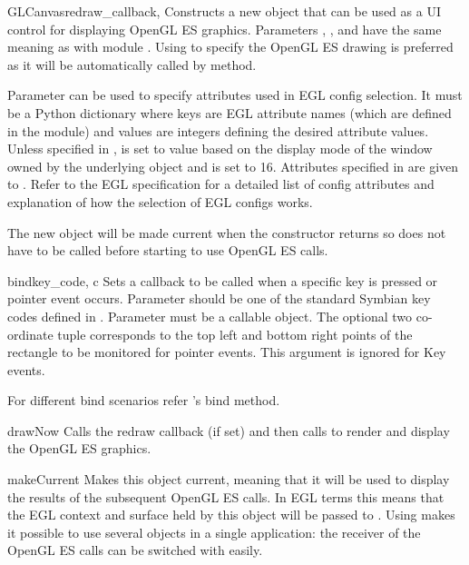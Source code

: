 \begin{classdesc}{GLCanvas}{redraw_callback, }
Constructs a new  object that can be used as a UI control for
displaying OpenGL ES graphics. Parameters ,
, and  have the same meaning as with
 module . Using  to specify
the OpenGL ES drawing is preferred as it will be automatically called by
 method.

Parameter  can be used to specify attributes used in EGL config
selection. It must be a Python dictionary where keys are EGL attribute names
(which are defined in the  module) and values are integers
defining the desired attribute values. Unless specified in ,
 is set to value based on the display mode of the window
owned by the underlying  object and  is
set to 16. Attributes specified in  are given to
. Refer to the EGL specification for a detailed list of
config attributes and explanation of how the selection of EGL configs works.

The new  object will be made current when the constructor
returns so  does not have to be called before starting to use
OpenGL ES calls.

\begin{methoddesc}[GLCanvas]{bind}{key_code, c }
Sets a callback to be called when a specific key is pressed or pointer event occurs. Parameter
 should be one of the standard Symbian key codes defined in
. Parameter  must be a callable object. The optional
two co-ordinate tuple corresponds to the top left and bottom right points of the
rectangle to be monitored for pointer events. This argument is ignored for Key events.

For different bind scenarios refer 's bind method.
\end{methoddesc}

\begin{methoddesc}[GLCanvas]{drawNow}{}
Calls the redraw callback (if set) and then calls  to
render and display the OpenGL ES graphics.
\end{methoddesc}

\begin{methoddesc}[GLCanvas]{makeCurrent}{}
Makes this  object current, meaning that it will be used to
display the results of the subsequent OpenGL ES calls. In EGL terms this means
that the EGL context and surface held by this object will be passed to
. Using  makes it possible to use several
 objects in a single application: the receiver of the OpenGL ES
calls can be switched with  easily.
\end{methoddesc}
\end{classdesc}
